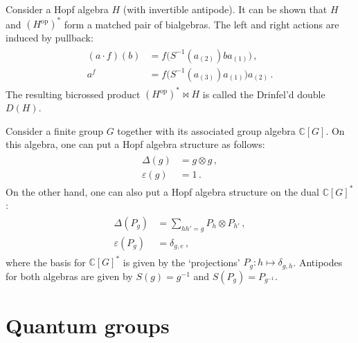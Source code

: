     \begin{construct}
        Consider a Hopf algebra $H$ (with invertible antipode). It can be shown that $H$ and $(H^{\text{op}})^*$ form a matched pair of bialgebras. The left and right actions are induced by pullback:
        \begin{gather}
            \begin{aligned}
                (a\cdot f)(b) &= f\bigl(S^{-1}(a_{(2)})ba_{(1)}\bigr)\,,\\
                a^f &= f\bigl(S^{-1}(a_{(3)})a_{(1)}\bigr)a_{(2)}\,.
            \end{aligned}
        \end{gather}
        The resulting bicrossed product $(H^{\text{op}})^*\bowtie H$ is called the Drinfel'd double $D(H)$.
    \end{construct}
    \begin{example}
        Consider a finite group $G$ together with its associated group algebra $\mathbb{C}[G]$. On this algebra, one can put a Hopf algebra structure as follows:
        \begin{gather}
            \begin{aligned}
                \Delta(g) &= g\otimes g\,,\\
                \varepsilon(g) &= 1\,.
            \end{aligned}
        \end{gather}
        On the other hand, one can also put a Hopf algebra structure on the dual $\mathbb{C}[G]^*$:
        \begin{gather}
            \begin{aligned}
                \Delta(P_g) &= \sum_{hh'=g}P_h\otimes P_{h'}\,,\\
                \varepsilon(P_g) &= \delta_{g,e}\,,
            \end{aligned}
        \end{gather}
        where the basis for $\mathbb{C}[G]^*$ is given by the `projections' $P_g:h\mapsto\delta_{g,h}$. Antipodes for both algebras are given by $S(g)=g^{-1}$ and $S(P_g)=P_{g^{-1}}$.
    \end{example}

\section{Quantum groups}


